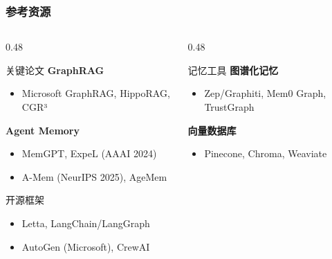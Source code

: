 \documentclass[aspectratio=169,10pt]{beamer}
\begin{document}
\begin{frame}
  \frametitle{参考资源}

  \begin{columns}[T]
    \begin{column}{0.48\textwidth}
      \begin{block}{关键论文}
        \footnotesize
        \textbf{GraphRAG}
        \begin{itemize}
          \item Microsoft GraphRAG, HippoRAG, CGR³
        \end{itemize}

        \vspace{0.1cm}

        \textbf{Agent Memory}
        \begin{itemize}
          \item MemGPT, ExpeL (AAAI 2024)
          \item A-Mem (NeurIPS 2025), AgeMem
        \end{itemize}
      \end{block}

      \vspace{0.15cm}

      \begin{block}{开源框架}
        \footnotesize
        \begin{itemize}
          \item Letta, LangChain/LangGraph
          \item AutoGen (Microsoft), CrewAI
        \end{itemize}
      \end{block}
    \end{column}

    \begin{column}{0.48\textwidth}
      \begin{block}{记忆工具}
        \footnotesize
        \textbf{图谱化记忆}
        \begin{itemize}
          \item Zep/Graphiti, Mem0 Graph, TrustGraph
        \end{itemize}

        \vspace{0.1cm}

        \textbf{向量数据库}
        \begin{itemize}
          \item Pinecone, Chroma, Weaviate
        \end{itemize}
      \end{block}


\end{column}
\end{columns}
\end{frame}
\end{document}
